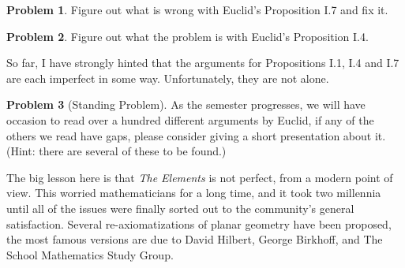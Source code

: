 \documentclass{tufte-handout}
\theoremstyle{definition}
\newtheorem{problem}{Problem}[section]
\begin{document}
\begin{problem}\label{prob:fix-I.7}
Figure out what is wrong with Euclid's Proposition I.7 and fix it.
\end{problem}

\begin{problem}\label{prob:fix-I.4}
Figure out what the problem is with Euclid's Proposition I.4.
\end{problem}

So far, I have strongly hinted that the arguments for Propositions I.1, I.4 and I.7 are each imperfect in some way.
Unfortunately, they are not alone.

\begin{problem}[Standing Problem]
As the semester progresses, we will have occasion to read over a hundred different arguments by Euclid, if any of the others we read have gaps, please consider giving a short presentation about it.
(Hint: there are several of these to be found.)
\end{problem}

The big lesson here is that \emph{The Elements} is not perfect, from a modern point of view.
This worried mathematicians for a long time, and it took two millennia until all of the issues were finally sorted out to the community's general satisfaction.
Several re-axiomatizations of planar geometry have been proposed, the most famous versions are due to David Hilbert, George Birkhoff, and The School Mathematics Study Group.

\vfill
\end{document}
